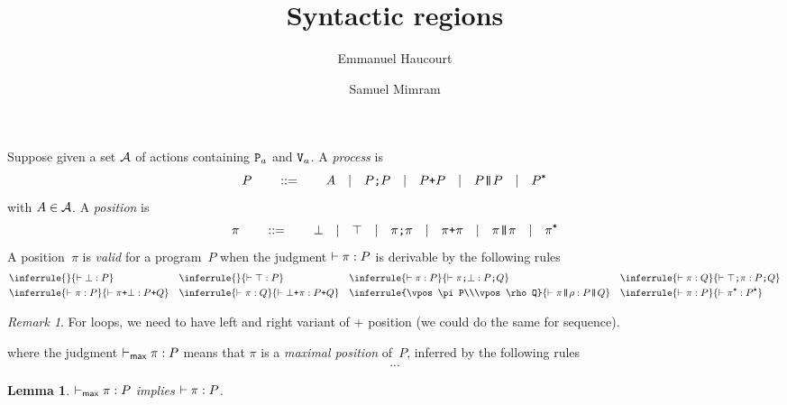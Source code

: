 \documentclass[a4paper]{article}
\title{Syntactic regions}
\author{Emmanuel Haucourt \and Samuel Mimram}
\theoremstyle{theorem}
\newtheorem{lemma}[theorem]{Lemma}
\theoremstyle{remark}
\newtheorem{remark}[theorem]{Remark}
\begin{document}
\maketitle

Suppose given a set $\actions$ of actions containing $\P a$ and $\V a$. A
\emph{process} is
\[
  P
  \qquad::=\qquad
  A
  \quad|\quad
  \pseq PP
  \quad|\quad
  \por PP
  \quad|\quad
  \ppar PP
  \quad|\quad
  \ploop P
\]
with $A\in\actions$. A \emph{position} is
\[
  \pi
  \qquad::=\qquad
  \pbot
  \quad|\quad
  \ptop
  \quad|\quad
  \pseq \pi\pi
  \quad|\quad
  \por \pi\pi
  \quad|\quad
  \ppar \pi\pi
  \quad|\quad
  \ploop \pi
\]
A position~$\pi$ is \emph{valid} for a program~$P$ when the judgment
$\vpos\pi P$ is derivable by the following rules
\begin{align*}
  &
  \inferrule{\null}{\vpos\pbot P}
  &&
  \inferrule{\null}{\vpos\ptop P}
  &&
  \inferrule{\vpos\pi P}{\vpos{\pseq\pi\pbot}{\pseq PQ}}
  &&
  \inferrule{\vpos\pi Q}{\vpos{\pseq\ptop\pi}{\pseq PQ}}
  \\
  &
  \inferrule{\vpos\pi P}{\vpos{\por\pi\bot}{\por PQ}}
  &&
  \inferrule{\vpos\pi Q}{\vpos{\por\bot\pi}{\por PQ}}
  &&
  \inferrule{\vpos\pi P\\\vpos\rho Q}{\vpos{\ppar\pi\rho}{\ppar PQ}}
  &&
  \inferrule{\vpos\pi P}{\vpos{\ploop\pi}{\ploop P}}
\end{align*}

\begin{remark}
  For loops, we need to have left and right variant of $+$ position (we could do
  the same for sequence).
\end{remark}


where the judgment $\mpos\pi P$ means that $\pi$ is a \emph{maximal position}
of~$P$, inferred by the following rules
\begin{align*}
  ...
\end{align*}

\begin{lemma}
  $\mpos\pi P$ implies $\vpos\pi P$.
\end{lemma}
\end{document}
